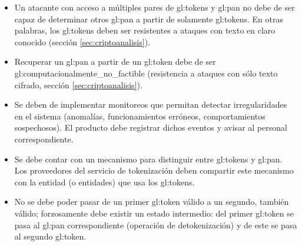 \begin{itemize}

  \item Un atacante con acceso a múltiples pares de \glspl{gl:token} y
    \gls{gl:pan} no debe de ser capaz de determinar otros \gls{gl:pan} a partir
    de solamente \glspl{gl:token}. En otras palabras, los \glspl{gl:token}
    deben ser resistentes a ataques con texto en claro conocido (sección
    \ref{sec:criptoanalisis}).

  \item Recuperar un \gls{gl:pan} a partir de un \gls{gl:token} debe de ser
    \gls{gl:computacionalmente_no_factible} (resistencia a ataques con sólo
    texto cifrado, sección \ref{sec:criptoanalisis}).

  \item Se deben de implementar monitoreos que permitan detectar
     irregularidades en el sistema (anomalías, funcionamientos erróneos,
     comportamientos sospechosos). El producto debe registrar dichos eventos y
     avisar al personal correspondiente.

  \item Se debe contar con un mecanismo para distinguir entre \glspl{gl:token}
    y \gls{gl:pan}. Los proveedores del servicio de tokenización deben
    compartir este mecanismo con la entidad (o entidades) que usa los
    \glspl{gl:token}.


  \item No se debe poder pasar de un primer \gls{gl:token} válido a un segundo,
    también válido; forzosamente debe existir un estado intermedio: del primer
    \gls{gl:token} se pasa al \gls{gl:pan} correspondiente (operación de
    detokenización) y de este se pasa al segundo \gls{gl:token}.


\end{itemize}
